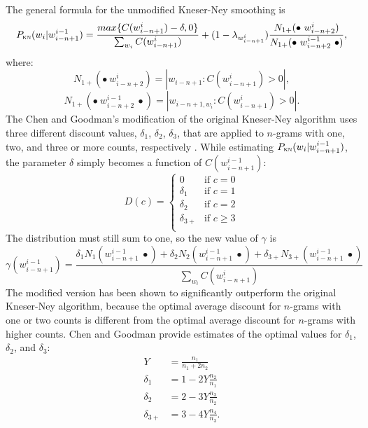 	The general formula for the unmodified Kneser-Ney smoothing is
	\begin{equation}
		P_{\textsc{kn}}(w_{i}|w_{i-n+1}^{i-1})= \frac{max\{C(w_{i-n+1}^{i})-\delta, 0\}}{\sum_{w_{i}}C(w_{i-n+1}^{i})}+(1-\lambda_{w_{i-n+1}^{i}})\frac{N_{1+}(\bullet~w_{i-n+2}^{i})}{N_{1+}(\bullet~w_{i-n+2}^{i-1}~\bullet)},
	\end{equation}
	where:
	\begin{equation}
		N_{1+}(\bullet~w_{i-n+2}^{i})=|{w_{i-n+1}:C(w_{i-n+1}^{i})>0}|,
	\end{equation}
	\begin{equation}
		N_{1+}(\bullet~w_{i-n+2}^{i-1}~\bullet)=|{w_{i-n+1, w_{i}}:C(w_{i-n+1}^{i})>0}|.
	\end{equation}
	The Chen and Goodman's modification of the original Kneser-Ney algorithm uses three different discount values, $\delta_{1}$, $\delta_{2}$, $\delta_{3}$, that are applied to $n$-grams with one, two, and three or more counts, respectively \cite{chen1996empirical}. While estimating $P_{\textsc{kn}}(w_{i}|w_{i-n+1}^{i-1})$, the parameter $\delta$ simply becomes a function of $C(w_{i-n+1}^{i-1})$: 
	\begin{equation}
		D(c)=	
		\begin{cases}
			0 & \text{if } c=0\\
			\delta_{1} & \text{if } c=1\\
			\delta_{2} & \text{if } c=2\\
			\delta_{3+} & \text{if } c\geq3\\
		\end{cases}
	\end{equation}
	The distribution must still sum to one, so the new value of $\gamma$ is
	\begin{equation}
		\gamma(w_{i-n+1}^{i-1})=\frac{\delta_{1}N_{1}(w_{i-n+1}^{i-1}~\bullet)+\delta_{2}N_{2}(w_{i-n+1}^{i-1}~\bullet)+\delta_{3+}N_{3+}(w_{i-n+1}^{i-1}~\bullet)}{\sum_{w_{i}}C(w_{i-n+1}^{i})}
	\end{equation}
	The modified version has been shown to significantly outperform the original Kneser-Ney algorithm, because the optimal average discount for $n$-grams with one or two counts is different from the optimal average discount for $n$-grams with higher counts. Chen and Goodman provide estimates of the optimal values for $\delta_{1}$, $\delta_{2}$, and $\delta_{3}$:
	\begin{align}
		Y&=\frac{n_{1}}{n_{1}+2n_{2}} \nonumber\\ 
		\delta_{1}&=1-2Y\frac{n_{2}}{n_{1}} \nonumber\\
		\delta_{2}&=2-3Y\frac{n_{3}}{n_{2}} \nonumber\\
		\delta_{3+}&=3-4Y\frac{n_{4}}{n_{3}}.
	\end{align}
